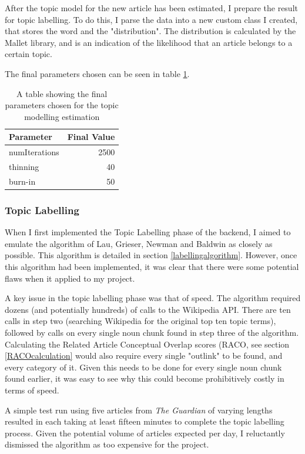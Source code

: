 \documentclass[12pt]{article}
\begin{document}
After the topic model for the new article has been estimated, I prepare the result for topic labelling. To do this, I parse the data into a new custom class I created, that stores the word and the "distribution". The distribution is calculated by the Mallet library, and is an indication of the likelihood that an article belongs to a certain topic.

The final parameters chosen can be seen in table \ref{topicmodellingestimation}.

\begin{table}[H]
	\centering
	\begin{tabular}{l|r}
		\textbf{Parameter} & \textbf{Final Value} \\ \hline
		numIterations & 2500 \\ \hline
		thinning & 40 \\ \hline
		burn-in & 50 \\ \hline
	\end{tabular}
	\caption[Parameters for estimating topic models]{A table showing the final parameters chosen for the topic modelling estimation}
	\label{topicmodellingestimation}
\end{table}

\subsubsection{Topic Labelling}

When I first implemented the Topic Labelling phase of the backend, I aimed to emulate the algorithm of Lau, Grieser, Newman and Baldwin as closely as possible. This algorithm is detailed in section \ref{labellingalgorithm}. However, once this algorithm had been implemented, it was clear that there were some potential flaws when it applied to my project.

A key issue in the topic labelling phase was that of speed. The algorithm required dozens (and potentially hundreds) of calls to the Wikipedia API. There are ten calls in step two (searching Wikipedia for the original top ten topic terms), followed by calls on every single noun chunk found in step three of the algorithm. Calculating the Related Article Conceptual Overlap scores (RACO, see section \ref{RACOcalculation} would also require every single "outlink" to be found, and every category of it. Given this needs to be done for every single noun chunk found earlier, it was easy to see why this could become prohibitively costly in terms of speed. 

A simple test run using five articles from \emph{The Guardian} of varying lengths resulted in each taking at least fifteen minutes to complete the topic labelling process. Given the potential volume of articles expected per day, I reluctantly dismissed the algorithm as too expensive for the project.
\end{document}

